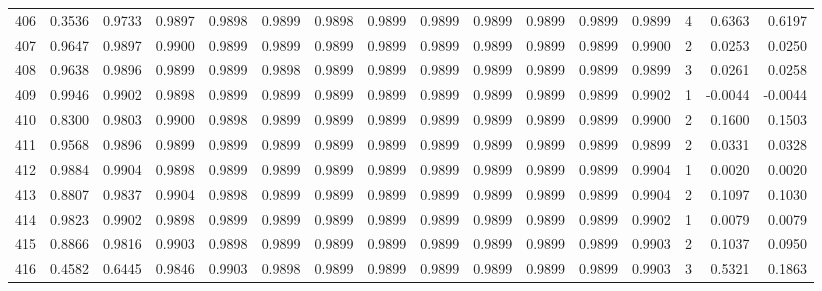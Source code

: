 \begin{tabular}{lrrrrrrrrrrrrrrr}
406 &      0.3536 &  0.9733 &  0.9897 &  0.9898 &  0.9899 &  0.9898 &  0.9899 &  0.9899 &  0.9899 &  0.9899 &   0.9899 &     0.9899 &      4 &                    0.6363 &                     0.6197 \\
407 &      0.9647 &  0.9897 &  0.9900 &  0.9899 &  0.9899 &  0.9899 &  0.9899 &  0.9899 &  0.9899 &  0.9899 &   0.9899 &     0.9900 &      2 &                    0.0253 &                     0.0250 \\
408 &      0.9638 &  0.9896 &  0.9899 &  0.9899 &  0.9898 &  0.9899 &  0.9899 &  0.9899 &  0.9899 &  0.9899 &   0.9899 &     0.9899 &      3 &                    0.0261 &                     0.0258 \\
409 &      0.9946 &  0.9902 &  0.9898 &  0.9899 &  0.9899 &  0.9899 &  0.9899 &  0.9899 &  0.9899 &  0.9899 &   0.9899 &     0.9902 &      1 &                   -0.0044 &                    -0.0044 \\
410 &      0.8300 &  0.9803 &  0.9900 &  0.9898 &  0.9899 &  0.9899 &  0.9899 &  0.9899 &  0.9899 &  0.9899 &   0.9899 &     0.9900 &      2 &                    0.1600 &                     0.1503 \\
411 &      0.9568 &  0.9896 &  0.9899 &  0.9899 &  0.9899 &  0.9899 &  0.9899 &  0.9899 &  0.9899 &  0.9899 &   0.9899 &     0.9899 &      2 &                    0.0331 &                     0.0328 \\
412 &      0.9884 &  0.9904 &  0.9898 &  0.9899 &  0.9899 &  0.9899 &  0.9899 &  0.9899 &  0.9899 &  0.9899 &   0.9899 &     0.9904 &      1 &                    0.0020 &                     0.0020 \\
413 &      0.8807 &  0.9837 &  0.9904 &  0.9898 &  0.9899 &  0.9899 &  0.9899 &  0.9899 &  0.9899 &  0.9899 &   0.9899 &     0.9904 &      2 &                    0.1097 &                     0.1030 \\
414 &      0.9823 &  0.9902 &  0.9898 &  0.9899 &  0.9899 &  0.9899 &  0.9899 &  0.9899 &  0.9899 &  0.9899 &   0.9899 &     0.9902 &      1 &                    0.0079 &                     0.0079 \\
415 &      0.8866 &  0.9816 &  0.9903 &  0.9898 &  0.9899 &  0.9899 &  0.9899 &  0.9899 &  0.9899 &  0.9899 &   0.9899 &     0.9903 &      2 &                    0.1037 &                     0.0950 \\
416 &      0.4582 &  0.6445 &  0.9846 &  0.9903 &  0.9898 &  0.9899 &  0.9899 &  0.9899 &  0.9899 &  0.9899 &   0.9899 &     0.9903 &      3 &                    0.5321 &                     0.1863 \\

\end{tabular}
